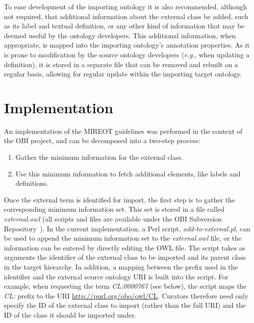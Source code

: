 \documentclass{ao2e}%
\begin{document}
To ease development of the importing ontology it is also recommended, although not required, that additional information about the external class be added, such as its label and textual definition, or any other kind of information that may be deemed useful by the ontology developers.
This additional information, when appropriate, is mapped into the importing ontology's annotation properties. As it is prone to modification by the source ontology developers (\textit{e.g.}, when updating a definition), it is stored in a separate file that can be removed and rebuilt on a regular basis, allowing for regular update within the importing target ontology. %


\section{Implementation}

An implementation of the \ac{MIREOT} guidelines was performed in the context of the \ac{OBI} project, and can be decomposed into a two-step process:

\begin{enumerate}
\item Gather the minimum information for the external class.
\item Use this minimum information to fetch additional elements, like labels and definitions.
\end{enumerate}

Once the external term is identified for import, the first step is to gather the corresponding minimum information set.
This set is stored in a file called \emph{external.owl} (all scripts and files are available under the \ac{OBI} Subversion Repository~\cite{OBIScripts}).
In the current implementation, a Perl script, \emph{add-to-external.pl}, can be used to append the minimum information set to the \emph{external.owl} file, or the information can be entered by directly editing the OWL file. %
The script takes as arguments the identifier of the external class to be imported and its parent class in the target hierarchy.
In addition, a mapping between the prefix used in the identifier and the external source ontology URI is built into the script. For example, when requesting the term \textit{CL:0000767} (see below), the script maps the \textit{CL:} prefix to the URI \url{http://purl.org/obo/owl/CL}.
Curators therefore need only specify the ID of the external class to import (rather than the full URI) and the ID of the class it should be imported under.
\end{document}
